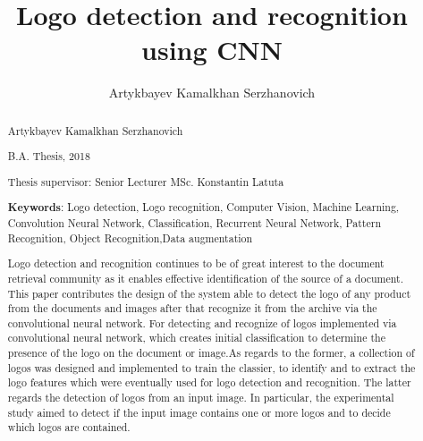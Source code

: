 \documentclass[12pt,epsfig,times]{report}
\title{Logo detection and recognition using CNN\vspace{-2cm}}
\author{Artykbayev Kamalkhan Serzhanovich}
\begin{document}
\makemstitle    %


\begin{abstract}
\par
\begin{center}
\centering Artykbayev Kamalkhan Serzhanovich
\end{center}

\par
\begin{center}
    \centering B.A. Thesis, 2018
\end{center}

\par
\begin{center}
\centering Thesis supervisor: Senior Lecturer MSc. Konstantin Latuta
\end{center}

\par
\noindent \textbf{Keywords}: Logo detection, Logo recognition, Computer Vision, Machine Learning, Convolution Neural Network, Classification, Recurrent Neural Network, Pattern Recognition, Object Recognition,Data augmentation

\noindent Logo detection and recognition continues to be of great interest to the document retrieval community as it enables effective identification of the source of a document. This paper contributes the design of the system able to detect the logo of any product from the documents and images after that recognize it from the archive via the convolutional neural network. For detecting and recognize of logos implemented via convolutional neural network, which creates initial classification to determine the presence of the logo on the document or image.As regards to the former, a collection of logos was designed and implemented to train the classier, to identify and to extract the logo features which were eventually used for logo detection and recognition. The latter regards the detection of logos from an input image. In particular, the experimental study aimed to detect if the input image contains one or more logos and to decide which logos are contained.

\end{abstract}
\end{document}

